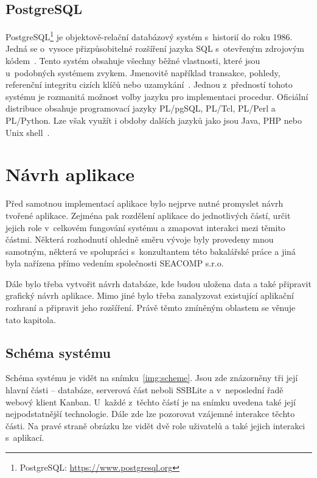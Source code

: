\section{PostgreSQL}
PostgreSQL\footnote{PostgreSQL: \url{https://www.postgresql.org}} je objektově-relační databázový systém s~historií do roku 1986. Jedná se o~vysoce přizpůsobitelné rozšíření jazyka SQL s~otevřeným zdrojovým kódem~\cite{bib:postgre}. Tento systém obsahuje všechny běžné vlastnosti, které jsou u~podobných systémem zvykem. Jmenovitě například transakce, pohledy, referenční integritu cizích klíčů nebo uzamykání~\cite{bib:postgre-begin}. Jednou z~předností tohoto systému je rozmanitá možnost volby jazyku pro implementaci procedur. Oficiální distribuce obsahuje programovací jazyky PL/pgSQL, PL/Tcl, PL/Perl a PL/Python. Lze však využít i obdoby dalších jazyků jako jsou Java, PHP nebo Unix shell~\cite{bib:postgre-lang}. 





\chapter{Návrh aplikace}
Před samotnou implementací aplikace bylo nejprve nutné promyslet návrh tvořené aplikace. Zejména pak rozdělení aplikace do jednotlivých částí, určit jejich role v~celkovém fungování systému a zmapovat interakci mezi těmito částmi. Některá rozhodnutí ohledně směru vývoje byly provedeny mnou samotným, některá ve spolupráci s~konzultantem této bakalářské práce a jiná byla nařízena přímo vedením společnosti SEACOMP s.r.o.

Dále bylo třeba vytvořit návrh databáze, kde budou uložena data a také připravit grafický návrh aplikace. Mimo jiné bylo třeba zanalyzovat existující aplikační rozhraní a připravit jeho rozšíření. 
Právě těmto zmíněným oblastem se věnuje tato kapitola.




\section{Schéma systému}
Schéma systému je vidět na snímku~\ref{img:scheme}. Jsou zde znázorněny tři její hlavní části -- databáze, serverová část neboli SSBLite a v~neposlední řadě webový klient Kanban. U~každé z~těchto částí je na snímku uvedena také její nejpodstatnější technologie. Dále zde lze pozorovat vzájemné interakce těchto části. Na pravé straně obrázku lze vidět dvě role uživatelů a také jejich interakci s~aplikací.

